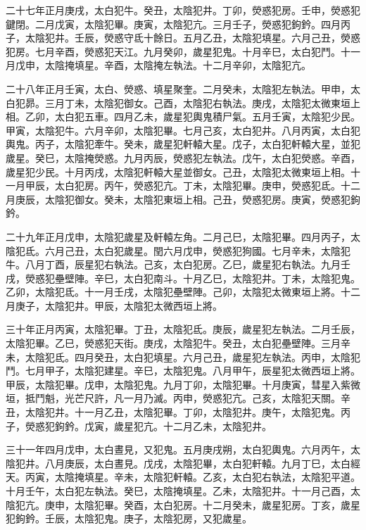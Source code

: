 \begin{pinyinscope}
 二十七年正月庚戌，太白犯牛。癸丑，太陰犯井。丁卯，熒惑犯房。壬申，熒惑犯鍵閉。二月戊寅，太陰犯畢。庚寅，太陰犯亢。三月壬子，熒惑犯鉤鈐。四月丙子，太陰犯井。壬辰，熒惑守氐十餘日。五月乙丑，太陰犯填星。六月己丑，熒惑犯房。七月辛酉，熒惑犯天江。九月癸卯，歲星犯鬼。十月辛巳，太白犯鬥。十一月戊申，太陰掩填星。辛酉，太陰掩左執法。十二月辛卯，太陰犯亢。



 二十八年正月壬寅，太白、熒惑、填星聚奎。二月癸未，太陰犯左執法。甲申，太白犯昴。三月丁未，太陰犯御女。己酉，太陰犯右執法。庚戌，太陰犯太微東垣上相。乙卯，太白犯五車。四月乙未，歲星犯輿鬼積尸氣。五月壬寅，太陰犯少民。甲寅，太陰犯牛。六月辛卯，太陰犯畢。七月己亥，太白犯井。八月丙寅，太白犯輿鬼。丙子，太陰犯牽牛。癸未，歲星犯軒轅大星。戊子，太白犯軒轅大星，並犯歲星。癸巳，太陰掩熒惑。九月丙辰，熒惑犯左執法。戊午，太白犯熒惑。辛酉，歲星犯少民。十月丙戌，太陰犯軒轅大星並御女。己丑，太陰犯太微東垣上相。十一月甲辰，太白犯房。丙午，熒惑犯亢。丁未，太陰犯畢。庚申，熒惑犯氐。十二月庚辰，太陰犯御女。癸未，太陰犯東垣上相。己丑，熒惑犯房。庚寅，熒惑犯鉤鈐。



 二十九年正月戊申，太陰犯歲星及軒轅左角。二月己巳，太陰犯畢。四月丙子，太陰犯氐。六月己丑，太白犯歲星。閏六月戊申，熒惑犯狗國。七月辛未，太陰犯牛。八月丁酉，辰星犯右執法。己亥，太白犯房。乙巳，歲星犯右執法。九月壬戌，熒惑犯壘壁陣。辛巳，太白犯南斗。十月乙巳，太陰犯井。丁未，太陰犯鬼。乙卯，太陰犯氐。十一月壬戌，太陰犯壘壁陣。己卯，太陰犯太微東垣上將。十二月庚子，太陰犯井。甲辰，太陰犯太微西垣上將。



 三十年正月丙寅，太陰犯畢。丁丑，太陰犯氐。庚辰，歲星犯左執法。二月壬辰，太陰犯畢。乙巳，熒惑犯天街。庚戌，太陰犯牛。癸丑，太白犯壘壁陣。三月辛未，太陰犯氐。四月癸丑，太白犯填星。六月己丑，歲星犯左執法。丙申，太陰犯鬥。七月甲子，太陰犯建星。辛巳，太陰犯鬼。八月甲午，辰星犯太微西垣上將。甲辰，太陰犯畢。戊申，太陰犯鬼。九月丁卯，太陰犯畢。十月庚寅，彗星入紫微垣，抵鬥魁，光芒尺許，凡一月乃滅。丙申，熒惑犯亢。己亥，太陰犯天關。辛丑，太陰犯井。十一月乙丑，太陰犯畢。丁卯，太陰犯井。庚午，太陰犯鬼。丙子，熒惑犯鉤鈐。戊寅，歲星犯亢。十二月乙未，太陰犯井。



 三十一年四月戊申，太白晝見，又犯鬼。五月庚戌朔，太白犯輿鬼。六月丙午，太陰犯井。八月庚辰，太白晝見。戊戌，太陰犯畢，太白犯軒轅。九月丁巳，太白經天。丙寅，太陰掩填星。辛未，太陰犯軒轅。乙亥，太白犯右執法，太陰犯平道。十月壬午，太白犯左執法。癸巳，太陰掩填星。乙未，太陰犯井。十一月己酉，太陰犯亢。庚申，太陰犯畢。癸酉，太白犯房。十二月癸未，歲星犯房。丁亥，歲星犯鉤鈐。壬辰，太陰犯鬼。庚子，太陰犯房，又犯歲星。




\end{pinyinscope}
